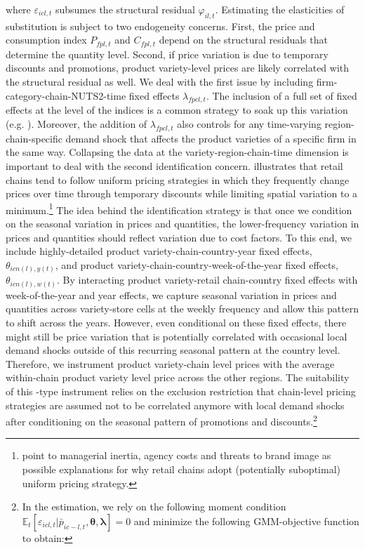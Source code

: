 \noindent where $\varepsilon_{icl,t}$ subsumes the structural residual $\varphi_{il,t}$. Estimating the elasticities of substitution is subject to two endogeneity concerns. First, the price and consumption index $P_{fpl,t}$ and $C_{fpl,t}$ depend on the structural residuals that determine the quantity level. Second, if price variation is due to temporary discounts and promotions, product variety-level prices are likely correlated with the structural residual as well. We deal with the first issue by including firm-category-chain-NUTS2-time fixed effects $\lambda_{fpcl,t}$. The inclusion of a full set of fixed effects at the level of the indices is a common strategy to soak up this variation (e.g. \citet{Atkin2018, Fajgelbaum2020}). Moreover, the addition of $\lambda_{fpcl,t}$ also controls for any time-varying region-chain-specific demand shock that affects the product varieties of a specific firm in the same way. Collapsing the data at the variety-region-chain-time dimension is important to deal with the second identification concern. \citet{Dellavigna2019} illustrates that retail chains tend to follow uniform pricing strategies in which they frequently change prices over time through temporary discounts while limiting spatial variation to a minimum.\footnote{\citet{Dellavigna2019} point to managerial inertia, agency costs and threats to brand image as possible explanations for why retail chains adopt (potentially suboptimal) uniform pricing strategy.} The idea behind the identification strategy is that once we condition on the seasonal variation in prices and quantities, the lower-frequency variation in prices and quantities should reflect variation due to cost factors. To this end, we include highly-detailed product variety-chain-country-year fixed effects, $\theta_{icn(l),y(t)}$, and product variety-chain-country-week-of-the-year fixed effects, $\theta_{icn(l),w(t)}$. By interacting product variety-retail chain-country fixed effects with week-of-the-year and year effects, we capture seasonal variation in prices and quantities across variety-store cells at the weekly frequency and allow this pattern to shift across the years. However, even conditional on these fixed effects, there might still be price variation that is potentially correlated with occasional local demand shocks outside of this recurring seasonal pattern at the country level. Therefore, we instrument product variety-chain level prices with the average within-chain product variety level price across the other regions. The suitability of this \citet{Hausman1996}-type instrument relies on the exclusion restriction that chain-level pricing strategies are assumed not to be correlated anymore with local demand shocks after conditioning on the seasonal pattern of promotions and discounts.\footnote{In the estimation, we rely on the following moment condition $\mathbb{E}_{t}\left[{\varepsilon_{icl,t}|\bar{p}_{ic-l,t},\boldsymbol{\theta},\boldsymbol{\lambda}}\right] = 0$ and minimize the following GMM-objective function to obtain: 
}
